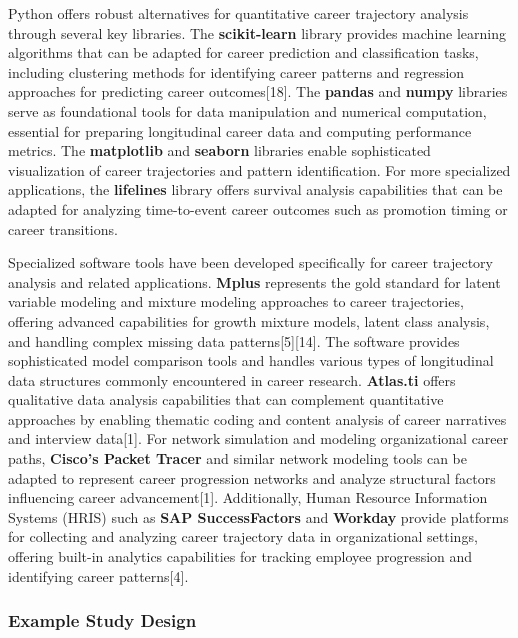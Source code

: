 \documentclass[main.tex]{subfiles}
\begin{document}
Python offers robust alternatives for quantitative career trajectory analysis through several key libraries. The \textbf{scikit-learn} library provides machine learning algorithms that can be adapted for career prediction and classification tasks, including clustering methods for identifying career patterns and regression approaches for predicting career outcomes[18]. The \textbf{pandas} and \textbf{numpy} libraries serve as foundational tools for data manipulation and numerical computation, essential for preparing longitudinal career data and computing performance metrics. The \textbf{matplotlib} and \textbf{seaborn} libraries enable sophisticated visualization of career trajectories and pattern identification. For more specialized applications, the \textbf{lifelines} library offers survival analysis capabilities that can be adapted for analyzing time-to-event career outcomes such as promotion timing or career transitions.

Specialized software tools have been developed specifically for career trajectory analysis and related applications. \textbf{Mplus} represents the gold standard for latent variable modeling and mixture modeling approaches to career trajectories, offering advanced capabilities for growth mixture models, latent class analysis, and handling complex missing data patterns[5][14]. The software provides sophisticated model comparison tools and handles various types of longitudinal data structures commonly encountered in career research. \textbf{Atlas.ti} offers qualitative data analysis capabilities that can complement quantitative approaches by enabling thematic coding and content analysis of career narratives and interview data[1]. For network simulation and modeling organizational career paths, \textbf{Cisco's Packet Tracer} and similar network modeling tools can be adapted to represent career progression networks and analyze structural factors influencing career advancement[1]. Additionally, Human Resource Information Systems (HRIS) such as \textbf{SAP SuccessFactors} and \textbf{Workday} provide platforms for collecting and analyzing career trajectory data in organizational settings, offering built-in analytics capabilities for tracking employee progression and identifying career patterns[4].

\subsubsection{Example Study Design}

\end{document}
